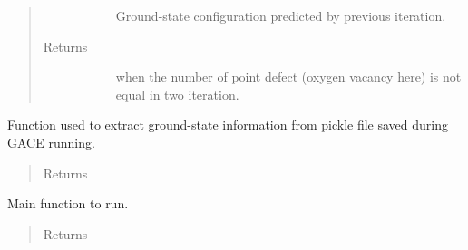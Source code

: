 \documentclass[letterpaper,10pt,english]{sphinxmanual}
\begin{document}
\begin{fulllineitems}
\begin{fulllineitems}
\begin{quote}
\begin{description}
\begin{description}
\item[{}] \leavevmode
Ground-state configuration predicted by previous iteration.

\end{description}

\item[{Returns}] \leavevmode\begin{description}
\item[{}] \leavevmode
\item[{}] \leavevmode
\item[{}] \leavevmode
when the number of point defect (oxygen vacancy here) is not equal
in two iteration.

\end{description}

\end{description}\end{quote}

\end{fulllineitems}


\begin{fulllineitems}
\label{\detokenize{pygace.examples.hfo2:pygace.examples.hfo2.hfo2_gace.Runner.print_gs}}
Function used to extract ground-state information from pickle file
saved during GACE running.
\begin{quote}\begin{description}
\item[{Returns}] \leavevmode\begin{description}
\item[{}] \leavevmode
\end{description}

\end{description}\end{quote}

\end{fulllineitems}


\begin{fulllineitems}
\label{\detokenize{pygace.examples.hfo2:pygace.examples.hfo2.hfo2_gace.Runner.run}}
Main function to run.
\begin{quote}\begin{description}
\item[{Returns}] \leavevmode\begin{description}
\item[{}] \leavevmode
\end{description}


\end{description}
\end{quote}
\end{fulllineitems}
\end{fulllineitems}
\end{document}
